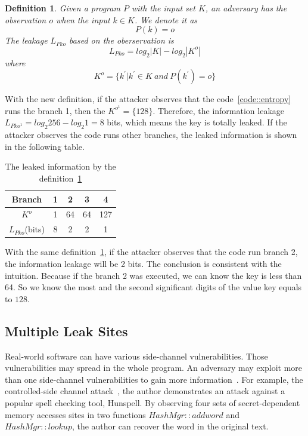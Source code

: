 \newtheorem{mydef}{Definition}

\begin{mydef}
\label{def}
Given a program $P$ with the input set $K$, 
an adversary has the observation $o$ when the input $k{\in}K$. 
We denote it as
    $$P(k) = o$$
The leakage $L_{Pko}$ based on the oberservation is
    $$L_{Pko} = log_2{|K|} - log_2{|K^o|}$$
    where
    $$K^o = \{k^{'} | k^{'}{\in}K \ and \ P(k^{'}) = o \}$$
\end{mydef}

With the new definition, if the attacker observes that the code~\ref{code::entropy} runs the branch 1, 
then the $K^{o^{1}} = \{128\}$. Therefore, the information leakage $L_{Pko^{1}} = log_2{256} - log_2{1} = 8$
bits, which means the key is totally leaked. If the attacker observes the code runs other
branches, the leaked information is shown in the following table.

\begin{table}[h]
    \centering
    \begin{tabular}{|c|c|c|c|c|}
    \hline
    Branch & 1 & 2  & 3  & 4   \\ \hline
    $K^o$   & 1 & 64 & 64 & 127 \\ \hline
    $L_{Pko}$(bits)   & 8 & 2  & 2  & 1   \\ \hline
    \end{tabular}
    \caption{The leaked information by the definition~\ref{def}}
\end{table}

With the same definition~\ref{def}, if the attacker observes that the code run branch 2, the information
leakage will be 2 bits. The conclusion is consistent with the intuition. Because if the branch 2 was
executed, we can know the key is less than 64. So we know the most and the second significant digits of 
the value key equals to $128$.

\subsection{Multiple Leak Sites}
Real-world software can have various side-channel vulnerabilities. Those vulnerabilities 
may spread in the whole program. An adversary may exploit more than one side-channel vulnerabilities 
to gain more information~\cite{7163052, 191010}. For example, the controlled-side channel attack~\cite{7163052}, 
the author demonstrates an attack against a popular spell checking tool, Hunspell. By observing four sets 
of secret-dependent memory accesses sites in two functions $HashMgr::addword$ and $HashMgr::lookup$, 
the author can recover the word in the original text.

